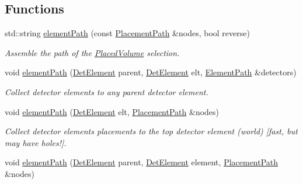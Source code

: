 \subsection*{Functions}
\begin{DoxyCompactItemize}
\item 
std\+::string \hyperlink{namespace_d_d4hep_1_1_geometry_1_1_detector_tools_a57debfb96b86738cbde272df6791a644}{element\+Path} (const \hyperlink{namespace_d_d4hep_1_1_geometry_1_1_detector_tools_a6cc33285199e04dd336a33e6e62925e6}{Placement\+Path} \&nodes, bool reverse)
\begin{DoxyCompactList}\small\item\em Assemble the path of the \hyperlink{class_d_d4hep_1_1_geometry_1_1_placed_volume}{Placed\+Volume} selection. \end{DoxyCompactList}\item 
void \hyperlink{namespace_d_d4hep_1_1_geometry_1_1_detector_tools_a33429898caa7f3ec3083fe50f04d01bc}{element\+Path} (\hyperlink{class_d_d4hep_1_1_geometry_1_1_det_element}{Det\+Element} parent, \hyperlink{class_d_d4hep_1_1_geometry_1_1_det_element}{Det\+Element} elt, \hyperlink{namespace_d_d4hep_1_1_geometry_1_1_detector_tools_a57c8f37a975258fd84676a69e74c56ab}{Element\+Path} \&detectors)
\begin{DoxyCompactList}\small\item\em Collect detector elements to any parent detector element. \end{DoxyCompactList}\item 
void \hyperlink{namespace_d_d4hep_1_1_geometry_1_1_detector_tools_a2788bc98d530b548cab41a422c67b48b}{element\+Path} (\hyperlink{class_d_d4hep_1_1_geometry_1_1_det_element}{Det\+Element} elt, \hyperlink{namespace_d_d4hep_1_1_geometry_1_1_detector_tools_a6cc33285199e04dd336a33e6e62925e6}{Placement\+Path} \&nodes)
\begin{DoxyCompactList}\small\item\em Collect detector elements placements to the top detector element (world) \mbox{[}fast, but may have holes!\mbox{]}. \end{DoxyCompactList}\item 
void \hyperlink{namespace_d_d4hep_1_1_geometry_1_1_detector_tools_a1855be34405c9ce43c236cfba6914850}{element\+Path} (\hyperlink{class_d_d4hep_1_1_geometry_1_1_det_element}{Det\+Element} parent, \hyperlink{class_d_d4hep_1_1_geometry_1_1_det_element}{Det\+Element} element, \hyperlink{namespace_d_d4hep_1_1_geometry_1_1_detector_tools_a6cc33285199e04dd336a33e6e62925e6}{Placement\+Path} \&nodes)

\end{DoxyCompactItemize}
